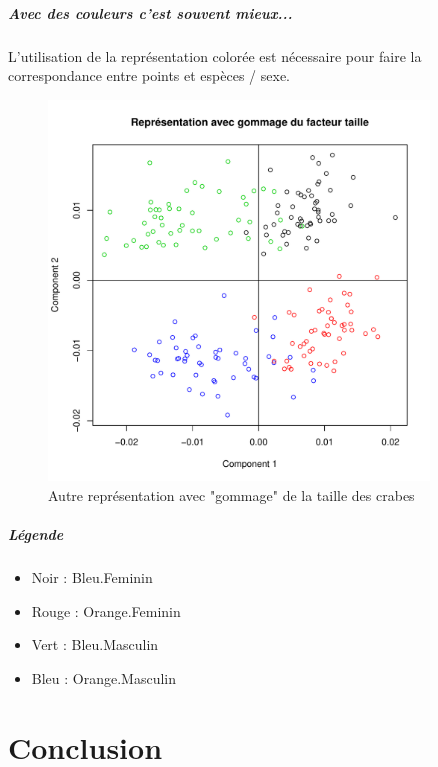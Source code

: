 \documentclass{report}
\begin{document}
\paragraph{Avec des couleurs c'est souvent mieux...}
L'utilisation de la représentation colorée est nécessaire pour faire la correspondance entre points et espèces / sexe.
\begin{figure}[h!]
\begin{center}
    \includegraphics[width=0.9\textwidth]{newcrabs2.pdf}
    \caption{Autre représentation avec "gommage" de la taille des crabes}
\end{center}
\end{figure}
\paragraph{Légende}
\begin{itemize}
\item Noir : Bleu.Feminin
\item Rouge : Orange.Feminin
\item Vert : Bleu.Masculin
\item Bleu : Orange.Masculin
\end{itemize}

\newpage
\chapter{Conclusion}
\end{document}
